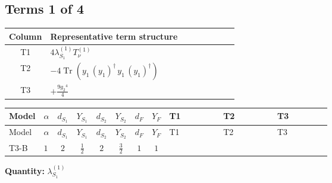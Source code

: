 \documentclass[8pt]{article}
\begin{document}
\begin{landscape}
\subsection*{Terms 1 of 4}
\begin{center}
\begin{tabular}{@{}c >{\raggedright\arraybackslash}p{0.82\linewidth}@{}}
\toprule
Column & Representative term structure \\
\midrule
T1 & \(\displaystyle 4 {\lambda_{S_1}^{(1)}} T_{\nu}^{(1)}\) \\
\midrule
T2 & \(\displaystyle -4 \operatorname{Tr}\!\left({y_1}\,\left({y_1}\right)^{\dagger}\,{y_1}\,\left({y_1}\right)^{\dagger}\right)\) \\
\midrule
T3 & \(\displaystyle +\frac{9 {g_2}^4}{4}\) \\
\midrule
\bottomrule
\end{tabular}
\end{center}
\smallskip
\tiny
\begin{longtable}{@{}llcccccc >{\raggedright\arraybackslash}p{0.21\linewidth} >{\raggedright\arraybackslash}p{0.21\linewidth} >{\raggedright\arraybackslash}p{0.21\linewidth}@{}}
\toprule
Model & $\alpha$ & $d_{S_1}$ & $Y_{S_1}$ & $d_{S_2}$ & $Y_{S_2}$ & $d_F$ & $Y_F$ & T1 & T2 & T3 \\
\midrule
\endfirsthead
\toprule
Model & $\alpha$ & $d_{S_1}$ & $Y_{S_1}$ & $d_{S_2}$ & $Y_{S_2}$ & $d_F$ & $Y_F$ & T1 & T2 & T3 \\
\midrule
\endhead
T3-B & $1$ & $2$ & $\frac{1}{2}$ & $2$ & $\frac{3}{2}$ & $1$ & $1$ & \scriptsize\adjustbox{max width=\linewidth}{$\begin{gathered} 4 {\lambda_{S_1}^{(1)}} T_{\nu}^{(1)}\end{gathered}$} & \scriptsize\adjustbox{max width=\linewidth}{$\begin{gathered} -4 \operatorname{Tr}\!\left({y_1}\,\left({y_1}\right)^{\dagger}\,{y_1}\,\left({y_1}\right)^{\dagger}\right)\end{gathered}$} & \scriptsize\adjustbox{max width=\linewidth}{$\begin{gathered} +\frac{9 {g_2}^4}{4}\end{gathered}$} \\
\midrule
\bottomrule
\end{longtable}
\clearpage
\noindent\textbf{Quantity: }$\lambda_{S_1}^{(1)}$\par\smallskip

\end{landscape}
\end{document}

